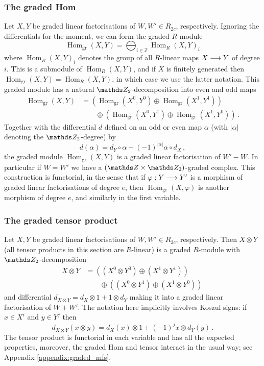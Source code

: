 \documentclass{compositio}
\theoremstyle{definition}
\numberwithin{equation}{section}
\def\Hom{\operatorname{Hom}}
\begin{document}
\subsubsection{The graded Hom} Let $X,Y$ be graded linear factorisations of $W,W' \in R_{2c}$, respectively. Ignoring the differentials for the moment, we can form the graded $R$-module
\[
\Hom_{\text{gr}}(X,Y) = \bigoplus_{i \in \mathds{Z}} \Hom_R(X,Y)_i
\]
where $\Hom_R(X,Y)_i$ denotes the group of all $R$-linear maps $X \longrightarrow Y$ of degree $i$. This is a submodule of $\Hom_R(X,Y)$, and if $X$ is finitely generated then $\Hom_{\text{gr}}(X,Y) = \Hom_R(X,Y)$, in which case we use the latter notation. This graded module has a natural $\Ztwo$-decomposition into even and odd maps
\begin{align*}
\Hom_{\text{gr}}(X,Y) &= \left( \Hom_{\text{gr}}(X^0, Y^0) \oplus \Hom_{\text{gr}}(X^1, Y^1) \right)\\
&\qquad \oplus \left( \Hom_{\text{gr}}(X^0, Y^1) \oplus \Hom_{\text{gr}}(X^1, Y^0) \right)\,.
\end{align*}
Together with the differential $d$ defined on an odd or even map $\alpha$ (with $|\alpha|$ denoting the $\Ztwo$-degree) by
\[
d(\alpha) = d_Y \circ \alpha - (-1)^{|\alpha|} \alpha \circ d_X \, ,
\]
the graded module $\Hom_{\text{gr}}(X,Y)$ is a graded linear factorisation of $W' - W$. In particular if $W = W'$ we have a $(\ZZ \times \Ztwo)$-graded complex. This construction is functorial, in the sense that if $\varphi: Y \longrightarrow Y'$ is a morphism of graded linear factorisations of degree $e$, then $\Hom_{\text{gr}}(X,\varphi)$ is another morphism of degree $e$, and similarly in the first variable.

\subsubsection{The graded tensor product} Let $X,Y$ be graded linear factorisations of $W,W' \in R_{2c}$, respectively. Then $X \otimes Y$ (all tensor products in this section are $R$-linear) is a graded $R$-module with $\Ztwo$-decomposition
\begin{align*}
X \otimes Y &= \left( (X^0 \otimes Y^0) \oplus (X^1 \otimes Y^1) \right)\\
&\qquad \oplus \left( (X^0 \otimes Y^1) \oplus (X^1 \otimes Y^0) \right)\,
\end{align*}
and differential $d_{X\otimes Y} = d_X \otimes 1 + 1 \otimes d_Y$ making it into a graded linear factorisation of $W + W'$. The notation here implicitly involves Koszul signs: if $x \in X^i$ and $y \in Y^j$ then
\[
d_{X\otimes Y}( x \otimes y ) = d_X(x) \otimes 1 + (-1)^j x \otimes d_Y(y) \, .
\]
The tensor product is functorial in each variable and has all the expected properties, moreover, the graded Hom and tensor interact in the usual way; see Appendix \ref{appendix:graded_mfs}.
\end{document}
